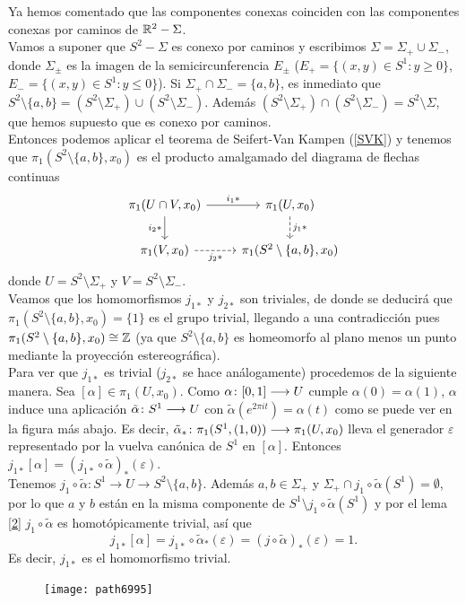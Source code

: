 \documentclass[GTS.tex]{subfiles}
\begin{document}
\begin{dem}
Ya hemos comentado que las componentes conexas coinciden con las componentes conexas por caminos de $\mathbb{R}^2-\Sigma$.\\
Vamos a suponer que $S^2-\Sigma$ es conexo por caminos y escribimos $\Sigma=\Sigma_+\cup\Sigma_-$, donde $\Sigma_\pm$ es la imagen de la semicircunferencia $E_\pm$ ($E_+=\{(x,y)\in S^1: y\geq 0\}$, $E_-=\{(x,y)\in S^1: y\leq 0\}$). Si $\Sigma_+\cap\Sigma_-=\{a,b\}$, es inmediato que $S^2\setminus\{a,b\}=(S^2\setminus\Sigma_+)\cup(S^2\setminus\Sigma_-)$. Además $(S^2\setminus\Sigma_+)\cap(S^2\setminus\Sigma_-)=S^2\setminus\Sigma$, que hemos supuesto que es conexo por caminos.\\
Entonces podemos aplicar el teorema de Seifert-Van Kampen (\ref{SVK}) y tenemos que $\pi_1(S^2\setminus\{a,b\},x_0)$ es el producto amalgamado del diagrama de flechas continuas
\[
\begin{tikzcd}
\pi_1(U\cap V,x_0)\arrow[r, "i_1*"]\arrow[d, "i_2*"'] & \pi_1(U,x_0)\arrow[d, dashed, "j_1*"]\\
\pi_1(V,x_0)\arrow[r,dashrightarrow, "j_2*"'] &\pi_1(S^2\setminus\{a,b\},x_0)
\end{tikzcd}
\]
donde $U=S^2\setminus\Sigma_+$ y $V=S^2\setminus\Sigma_-$.\\
Veamos que los homomorfismos $j_{1*}$ y $j_{2*}$ son triviales, de donde se deducirá que $\pi_1(S^2\setminus\{a,b\},x_0)=\{1\}$ es el grupo trivial, llegando a una contradicción pues $\pi_1(S^2\setminus\{a,b\},x_0)\cong\mathbb{Z}$ (ya que $S^2\setminus\{a,b\}$ es homeomorfo al plano menos un punto mediante la proyección estereográfica).\\
Para ver que $j_{1*}$ es trivial ($j_{2*}$ se hace análogamente) procedemos de la siguiente manera. Sea $[\alpha]\in\pi_1(U,x_0)$. Como $\alpha\colon{[0,1]}\longrightarrow{U}$ cumple $\alpha(0)=\alpha(1)$, $\alpha$ induce una aplicación $\tilde{\alpha}\colon{S^1}\longrightarrow{U}$ con $\tilde{\alpha}(e^{2\pi it})=\alpha(t)$ como se puede ver en la figura más abajo. Es decir, $\tilde{\alpha}_*\colon{\pi_1(S^1,(1,0))}\longrightarrow{\pi_1(U,x_0)}$ lleva el generador $\varepsilon$ representado por la vuelva canónica de $S^1$ en $[\alpha]$. Entonces $j_{1*}[\alpha]=(j_{1*}\circ\tilde{\alpha})_*(\varepsilon)$.\\
Tenemos $j_1\circ\tilde{\alpha}:S^1\longrightarrow U\longrightarrow S^2\setminus\{a,b\}$. Además $a,b\in\Sigma_+$ y $\Sigma_+\cap j_1\circ\tilde{\alpha}(S^1)=\emptyset$, por lo que $a$ y $b$ están en la misma componente de $S^1\setminus j_1\circ\tilde{\alpha}(S^1)$ y por el lema \ref{2} $j_1\circ\tilde{\alpha}$ es homotópicamente trivial, así que
\[
j_{1*}[\alpha]=j_{1*}\circ\tilde{\alpha}_*(\varepsilon)=(j\circ\tilde{\alpha})_*(\varepsilon)=1.
\]
Es decir, $j_{1*}$ es el homomorfismo trivial.

\begin{figure}[h!]
	\texttt{[image: path6995]}
\end{figure}

\end{dem}
\end{document}
